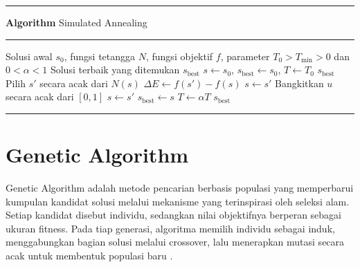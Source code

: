 \begingroup
\setlength{\parskip}{0pt}
\begin{list}{}{\setlength{\leftmargin}{0.05\linewidth}\setlength{\rightmargin}{0.05\linewidth}\setlength{\labelsep}{0pt}\setlength{\topsep}{0pt}\setlength{\partopsep}{0pt}\setlength{\parsep}{0pt}\setlength{\itemsep}{0pt}}\item[]
\noindent\rule{\linewidth}{0.8pt}\par\vspace{1pt}
\noindent{}\textbf{Algorithm \thealgorithm} Simulated Annealing\label{alg:simulated-annealing}\par
\vspace{1pt}\noindent\rule{\linewidth}{0.4pt}\par\vspace{1pt}
\begin{algorithmic}
    \REQUIRE Solusi awal $s_0$, fungsi tetangga $N$, fungsi objektif $f$, parameter $T_0>T_{\min}>0$ dan $0<\alpha<1$
    \ENSURE Solusi terbaik yang ditemukan $s_{\text{best}}$
    \STATE $s \gets s_0$, $s_{\text{best}} \gets s_0$, $T \gets T_0$
    \RETURN $s_{\text{best}}$
    \ENDIF
    \STATE Pilih $s'$ secara acak dari $N(s)$
    \STATE $\Delta E \gets f(s') - f(s)$
    \STATE $s \gets s'$
    \ELSE
    \STATE Bangkitkan $u$ secara acak dari $[0,1]$
    \STATE $s \gets s'$
    \ENDIF
    \ENDIF
    \STATE $s_{\text{best}} \gets s$
    \ENDIF
    \STATE $T \gets \alpha T$
    \ENDWHILE
    \RETURN $s_{\text{best}}$
\end{algorithmic}
\par\vspace{1pt}\noindent\rule{\linewidth}{0.8pt}

\end{list}
\endgroup

\section{Genetic Algorithm}

Genetic Algorithm adalah metode pencarian berbasis populasi yang memperbarui kumpulan kandidat solusi melalui mekanisme yang terinspirasi oleh seleksi alam. Setiap kandidat disebut individu, sedangkan nilai objektifnya berperan sebagai ukuran fitness. Pada tiap generasi, algoritma memilih individu sebagai induk, menggabungkan bagian solusi melalui crossover, lalu menerapkan mutasi secara acak untuk membentuk populasi baru \cite{russell2021artificial,goldberg1989genetic}.

